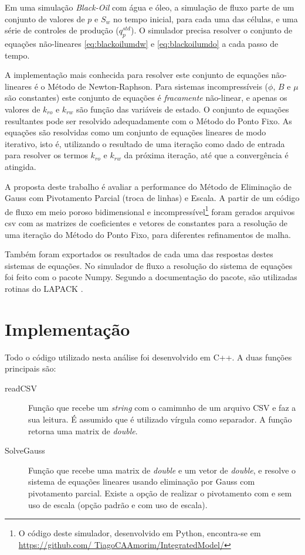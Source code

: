 \documentclass[final,5p]{elsarticle}
\numberwithin{equation}{section}
\begin{document}
            Em uma simulação \emph{Black-Oil} com água e óleo, a simulação de fluxo parte de um conjunto de valores de $p$ e $S_w$ no tempo inicial, para cada uma das células, e uma série de controles de produção ($q^{std}_p$). O simulador precisa resolver o conjunto de equações não-lineares \ref{eq:blackoilumdw} e \ref{eq:blackoilumdo} a cada passo de tempo.

            A implementação mais conhecida para resolver este conjunto de equações não-lineares é o Método de Newton-Raphson. Para sistemas incompressíveis ($\phi$, $B$ e $\mu$ são constantes) este conjunto de equações é \emph{fracamente} não-linear, e apenas os valores de $k_{ro}$ e $k_{rw}$ são função das variáveis de estado. O conjunto de equações resultantes pode ser resolvido adequadamente com o Método do Ponto Fixo. As equações são resolvidas como um conjunto de equações lineares de modo iterativo, isto é, utilizando o resultado de uma iteração como dado de entrada para resolver os termos $k_{ro}$ e $k_{rw}$ da próxima iteração, até que a convergência é atingida.

            A proposta deste trabalho é avaliar a performance do Método de Eliminação de Gauss com Pivotamento Parcial (troca de linhas) e Escala. A partir de um código de fluxo em meio poroso bidimensional e incompressível\footnote{O código deste simulador, desenvolvido em Python, encontra-se em \href{https://github.com/TiagoCAAmorim/IntegratedModel/tree/test_matrix}{https://github.com/ TiagoCAAmorim/IntegratedModel/}} foram gerados arquivos csv com as matrizes de coeficientes e vetores de constantes para a resolução de uma iteração do Método do Ponto Fixo, para diferentes refinamentos de malha.

            Também foram exportados os resultados de cada uma das respostas destes sistemas de equações. No simulador de fluxo a resolução do sistema de equações foi feito com o pacote Numpy. Segundo a documentação do pacote, são utilizadas rotinas do LAPACK \cite{dongarra1992lapack}.

\section{Implementação} \label{sec:implementacao}

        Todo o código utilizado nesta análise foi desenvolvido em C++. A duas funções principais são:

        \begin{description}
            \item[readCSV] Função que recebe um \emph{string} com o camimnho de um arquivo CSV e faz a sua leitura. É assumido que é utilizado vírgula como separador. A função retorna uma matrix de \emph{double}.
            \item[SolveGauss] Função que recebe uma matrix de \emph{double} e um vetor de \emph{double}, e resolve o sistema de equações lineares usando eliminação por Gauss com pivotamento parcial. Existe a opção de realizar o pivotamento com e sem uso de escala (opção padrão e com uso de escala).
        \end{description}
\end{document}
